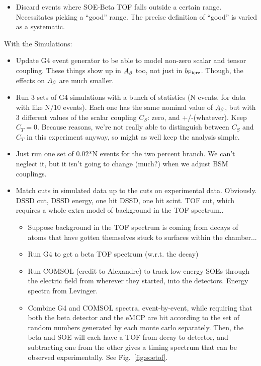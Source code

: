 \begin{itemize}
\begin{itemize}
		\item Discard events where SOE-Beta TOF falls outside a certain range.  Necessitates picking a ``good'' range.  The precise definition of ``good'' is varied as a systematic.
		\end{itemize}
\end{itemize}

\vspace{24pt}
\vspace{12pt}
With the Simulations:
\begin{itemize}
	\item Update G4 event generator to be able to model non-zero scalar and tensor coupling.  These things show up in $A_{\beta}$ too, not just in $b_{\mathrm{Fierz}}$.  Though, the effects on $A_{\beta}$ are much smaller.
	\item Run 3 sets of G4 simulations with a bunch of statistics (N events, for data with like N/10 events).  Each one has the same nominal value of $A_{\beta}$, but with 3 different values of the scalar coupling $C_S$:  zero, and +/-(whatever).  Keep $C_T=0$.  Because reasons, we're not really able to distinguish between $C_S$ and $C_T$ in this experiment anyway, so might as well keep the analysis simple.
	\item Just run one set of 0.02*N events for the two percent branch.  We can't neglect it, but it isn't going to change (much?) when we adjust BSM couplings.
	\item Match cuts in simulated data up to the cuts on experimental data.  Obviously.  DSSD cut, DSSD energy, one hit DSSD, one hit scint.  TOF cut, which requires a whole extra model of background in the TOF spectrum..
		\begin{itemize}
		\item Suppose background in the TOF spectrum is coming from decays of atoms that have gotten themselves stuck to surfaces within the chamber...
		\item Run G4 to get a beta TOF spectrum (w.r.t. the decay)
		\item Run COMSOL (credit to Alexandre) to track low-energy SOEs through the electric field from wherever they started, into the detectors.  Energy spectra from Levinger.
		\item Combine G4 and COMSOL spectra, event-by-event, while requiring that both the beta detector and the eMCP are hit according to the set of random numbers generated by each monte carlo separately.  Then, the beta and SOE will each have a TOF from decay to detector, and subtracting one from the other gives a timing spectrum that can be observed experimentally.  See Fig.~\ref{fig:soetof}.

\end{itemize}
\end{itemize}
